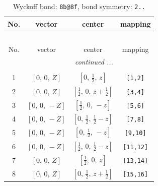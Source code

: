 \documentclass[fleqn,8pt]{jsarticle}
\begin{document}
\begin{longtable}{cccc}
\caption{Wyckoff bond: {\tt 8b@8f}, bond symmetry: {\tt 2..}}
 \\
 \hline \hline
No. & vector & center & mapping \\ \hline \endfirsthead

\multicolumn{3}{l}{\tablename\ \thetable{}} \\
 \hline \hline
No. & vector & center & mapping \\ \hline \endhead

 \hline \hline
\multicolumn{3}{r}{\footnotesize\it continued ...} \\ \endfoot

 \hline \hline
\multicolumn{3}{r}{} \\ \endlastfoot

1 & $\left[ 0,\, 0,\, Z \right]$ & $\left[ 0,\, \frac{1}{2},\, z \right]$ & {\tt [1,2]} \\ \hline
2 & $\left[ 0,\, 0,\, Z \right]$ & $\left[ \frac{1}{2},\, 0,\, z + \frac{1}{2} \right]$ & {\tt [3,4]} \\ \hline
3 & $\left[ 0,\, 0,\, - Z \right]$ & $\left[ \frac{1}{2},\, 0,\, - z \right]$ & {\tt [5,6]} \\ \hline
4 & $\left[ 0,\, 0,\, - Z \right]$ & $\left[ 0,\, \frac{1}{2},\, \frac{1}{2} - z \right]$ & {\tt [7,8]} \\ \hline
5 & $\left[ 0,\, 0,\, - Z \right]$ & $\left[ 0,\, \frac{1}{2},\, - z \right]$ & {\tt [9,10]} \\ \hline
6 & $\left[ 0,\, 0,\, - Z \right]$ & $\left[ \frac{1}{2},\, 0,\, \frac{1}{2} - z \right]$ & {\tt [11,12]} \\ \hline
7 & $\left[ 0,\, 0,\, Z \right]$ & $\left[ \frac{1}{2},\, 0,\, z \right]$ & {\tt [13,14]} \\ \hline
8 & $\left[ 0,\, 0,\, Z \right]$ & $\left[ 0,\, \frac{1}{2},\, z + \frac{1}{2} \right]$ & {\tt [15,16]} \\
\end{longtable}
\renewcommand{\arraystretch}{1.2}
\end{document}
